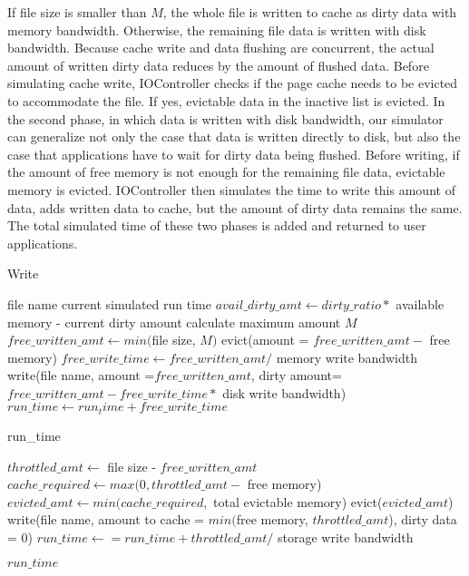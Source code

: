 \documentclass[conference]{IEEEtran}
\newcommand{\Desc}[2]{\State \makebox[5em][l]{#1}#2}
\begin{document}
			If file size is smaller than $M$, the whole file is written to cache as dirty data with memory bandwidth. Otherwise, the remaining file data is written with disk bandwidth. Because cache write and data flushing are concurrent, the actual amount of written dirty data reduces by the amount of flushed data. Before simulating cache write, IOController checks if the page cache needs to be evicted to accommodate the file. If yes, evictable data in the inactive list is evicted. In the second phase, in which data is written with disk bandwidth, our simulator can generalize not only the case that data is written directly to disk, but also the case that applications have to wait for dirty data being flushed. Before writing, if the amount of free memory is not enough for the remaining file data, evictable memory is evicted. IOController then simulates the time to write this amount of data, adds written data to cache, but the amount of dirty data remains the same. The total simulated time of these two phases is added and returned to user applications.		
			
			\begin{algorithm}\caption{Write}\label{alg:write}
				\small
				\begin{algorithmic}[1]
					\Input
        				\Desc{$file\_name$}{file name}
			        	\Desc{$run\_time$}{current simulated run time}
   					\EndInput
					\State $avail\_dirty\_amt \gets dirty\_ratio *$ available memory - current dirty amount
   						\State calculate maximum amount $M$
   						\State $free\_written\_amt \gets min($file size, $M)$
    						\State evict(amount = $free\_written\_amt -$ free memory)
    					\EndIf
    					\State $free\_write\_time \gets free\_written\_amt /$ memory write bandwidth
    					\State write(file name, amount =$free\_written\_amt$, dirty amount=$free\_written\_amt - free\_write\_time *$ disk write bandwidth)
   						\State $run\_time \gets run_time +free\_write\_time$
    				\EndIf
					
						\Return run\_time
					\EndIf

					\State $throttled\_amt \gets $ file size - $free\_written\_amt$
					\State $cache\_required \gets max(0, throttled\_amt  -$ free memory)
					\State $evicted\_amt \gets min(cache\_required,$ total evictable memory)
						\State  evict($evicted\_amt$)
					\EndIf
					\State write(file name, amount to cache = $min($free memory, $throttled\_amt$), dirty data = 0)
					\State $run\_time \gets = run\_time + throttled\_amt /$ storage write bandwidth

					\Return $run{\_}time$
					
				\end{algorithmic}
			\end{algorithm}	
			
\end{document}
